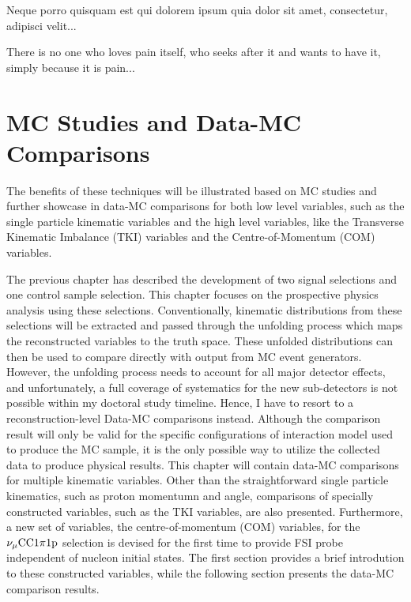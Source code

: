 \begin{savequote}[8cm]
\textlatin{Neque porro quisquam est qui dolorem ipsum quia dolor sit amet, consectetur, adipisci velit...}

There is no one who loves pain itself, who seeks after it and wants to have it, simply because it is pain...
\end{savequote}

\chapter{\label{ch:5-mcdata}MC Studies and Data-MC Comparisons} 

\minitoc


The benefits of these techniques will be illustrated based on MC studies and further showcase in data-MC comparisons for both low level variables, such as the single particle kinematic variables and the high level variables, like the Transverse Kinematic Imbalance (TKI) variables and the Centre-of-Momentum (COM) variables. 



The previous chapter has described the development of two signal selections and one control sample selection. This chapter focuses on the prospective physics analysis using these selections.
Conventionally, kinematic distributions from these selections will be extracted and passed through the unfolding process which maps the reconstructed variables to the truth space. 
These unfolded distributions can then be used to compare directly with output from MC event generators.
However, the unfolding process needs to account for all major detector effects, and unfortunately, a full coverage of systematics for the new sub-detectors is not possible within my doctoral study timeline.
Hence, I have to resort to a reconstruction-level Data-MC comparisons instead.
Although the comparison result will only be valid for the specific configurations of interaction model used to produce the MC sample, it is the only possible way to utilize the collected data to produce physical results.
This chapter will contain data-MC comparisons for multiple kinematic variables. 
Other than the straightforward single particle kinematics, such as proton momentumn and angle, comparisons of specially constructed variables, such as the TKI variables, are also presented. 
Furthermore, a new set of variables, the centre-of-momentum (COM) variables, for the $\nu_{\mu}\textrm{CC}1\pi1\textrm{p}$ selection is devised for the first time to provide FSI probe independent of nucleon initial states.
The first section provides a brief introdution to these constructed variables, while the following section presents the data-MC comparison results.

